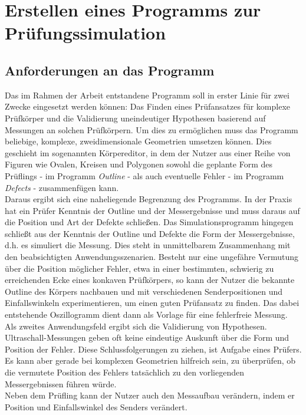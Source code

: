 \documentclass[reducespace,stylepage,semiarbeit]{spezidoc}
\begin{document}
\newpage
\section{Erstellen eines Programms zur Prüfungssimulation }\label{sec:sim}

\subsection{Anforderungen an das Programm}

Das im Rahmen der Arbeit entstandene Programm soll in erster Linie für zwei Zwecke eingesetzt werden können: Das Finden eines Prüfansatzes für komplexe Prüfkörper und die Validierung uneindeutiger Hypothesen basierend auf Messungen an solchen Prüfkörpern.
Um dies zu ermöglichen muss das Programm beliebige, komplexe, zweidimensionale Geometrien umsetzen können. 
Dies geschieht im sogenannten Körpereditor, in dem der Nutzer aus einer Reihe von Figuren wie Ovalen, Kreisen und Polygonen sowohl die geplante Form des Prüflings - im Programm \textit{Outline} - als auch eventuelle Fehler - im Programm \textit{Defects} - zusammenfügen kann. \\
Daraus ergibt sich eine naheliegende Begrenzung des Programms. 
In der Praxis hat ein Prüfer Kenntnis der Outline und der Messergebnisse und muss daraus auf die Position und Art der Defekte schließen. 
Das Simulationsprogramm hingegen schließt aus der Kenntnis der Outline und Defekte die Form der Messergebnisse, d.h. es simuliert die Messung. 
Dies steht in unmittelbarem Zusammenhang mit den beabsichtigten Anwendungsszenarien.
Besteht nur eine ungefähre Vermutung über die Position möglicher Fehler, etwa in einer bestimmten, schwierig zu erreichenden Ecke eines konkaven Prüfkörpers, so kann der Nutzer die bekannte Outline des Körpers nachbauen und mit verschiedenen Senderpositionen und Einfallswinkeln experimentieren, um einen guten Prüfansatz zu finden. 
Das dabei entstehende Oszillogramm dient dann als Vorlage für eine fehlerfreie Messung. \\
Als zweites Anwendungsfeld ergibt sich die Validierung von Hypothesen. 
Ultraschall-Messungen geben oft keine eindeutige Auskunft über die Form und Position der Fehler. 
Diese Schlussfolgerungen zu ziehen, ist Aufgabe eines Prüfers. 
Es kann aber gerade bei komplexen Geometrien hilfreich sein, zu überprüfen, ob die vermutete Position des Fehlers tatsächlich zu den vorliegenden Messergebnissen führen würde. \\
Neben dem Prüfling kann der Nutzer auch den Messaufbau verändern, indem er Position und Einfallswinkel des Senders verändert. 
\end{document}
